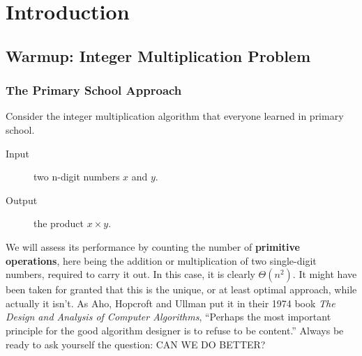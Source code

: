 \ifx\PREAMBLE\undefined


\fi
\chapter{Introduction}
\section{Warmup: Integer Multiplication Problem}
\subsection{The Primary School Approach}
Consider the integer multiplication algorithm that everyone learned in primary school.
\begin{description}
\item[Input]two n-digit numbers $x$ and $y$.
\item[Output]the product $x\times y$.
\end{description}
We will assess its performance by counting the number of \textbf{primitive operations}, here being the addition or multiplication of two single-digit numbers, required to carry it out. In this case, it is clearly $\Theta(n^2)$. It might have been taken for granted that this is the unique, or at least optimal approach, while actually it isn't. As Aho, Hopcroft and Ullman put it in their 1974 book \emph{The Design and Analysis of Computer Algorithms}, ``Perhaps the most important principle for the good algorithm designer is to refuse to be content.'' Always be ready to ask yourself the question: CAN WE DO BETTER?
